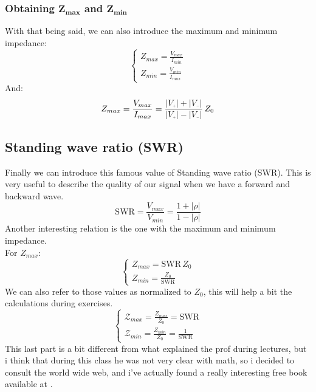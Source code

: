 \subsubsection*{Obtaining $\bm{Z_{max}}$ and $\bm{Z_{min}}$}
With that being said, we can also introduce the maximum and minimum\\
impedance:
\begin{equation}
    \begin{cases}
        Z_{max} = \frac{V_{max}}{I_{min}}\\
        Z_{min} = \frac{V_{min}}{I_{max}}
    \end{cases}
\end{equation}
And:
\begin{equation}
    Z_{max}=\frac{V_{max}}{I_{max}}=\frac{|V\bottomPlus|+|V\bottomMinus|}{|V\bottomPlus|-|V\bottomMinus|}\,Z_0
\end{equation}
\subsection*{Standing wave ratio (SWR)}
Finally we can introduce this famous value of Standing wave ratio (SWR). This is very useful to describe the quality of our signal when we have a forward and backward wave.
\begin{equation}\label{eq:swr_def}
    \text{SWR}=\frac{V_{max}}{V_{min}}=\frac{1+|\rho|}{1-|\rho|}
\end{equation}
Another interesting relation is the one with the maximum and minimum\\
impedance.\\
For $Z_{max}$:
\begin{equation}
    \begin{cases}
        Z_{max} = \text{SWR}\,Z_0 \\
        Z_{min} = \frac{Z_0}{\text{SWR}}
    \end{cases}
\end{equation}
We can also refer to those values as normalized to $Z_0$, this will help a bit the calculations during exercises.
\begin{equation}
    \begin{cases}\label{eq:normalized_impedance}
        \mathcal{Z}_{max} = \frac{Z_{max}}{Z_0}=\text{SWR}\\
        \mathcal{Z}_{min} = \frac{Z_{min}}{Z_0}=\frac{1}{\text{SWR}}
    \end{cases}
\end{equation}
This last part is a bit different from what explained the prof during lectures, but i think that during this class he was not very clear with math, so i decided to consult the world wide web, and i've actually found a really interesting free book available at \cite{Ellingson2020Book}.
